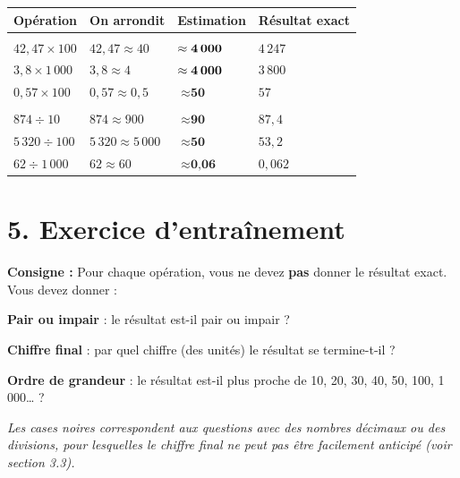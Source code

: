 \documentclass{exam}
\begin{document}
\begin{center}
\renewcommand{\arraystretch}{1.5}
\begin{tabular}{|>{\centering}p{3.5cm}|>{\centering}p{3.5cm}|>{\centering}p{3cm}|>{\centering\arraybackslash}p{3cm}|}
\hline
\rowcolor{gray!20}
\textbf{Opération} & \textbf{On arrondit} & \textbf{Estimation} & \textbf{Résultat exact} \\
\hline
\rowcolor{gray!10} \multicolumn{4}{|c|}{\textit{Multiplications}} \\ \hline
$42{,}47 \times 100$ & $42{,}47 \approx 40$ & $\approx \textbf{4\,000}$ & $4\,247$ \\ \hline
$3{,}8 \times 1\,000$ & $3{,}8 \approx 4$ & $\approx \textbf{4\,000}$ & $3\,800$ \\ \hline
$0{,}57 \times 100$ & $0{,}57 \approx 0{,}5$ & $\approx \textbf{50}$ & $57$ \\ \hline
\rowcolor{gray!10} \multicolumn{4}{|c|}{\textit{Divisions}} \\ \hline
$874 \div 10$ & $874 \approx 900$ & $\approx \textbf{90}$ & $87{,}4$ \\ \hline
$5\,320 \div 100$ & $5\,320 \approx 5\,000$ & $\approx \textbf{50}$ & $53{,}2$ \\ \hline
$62 \div 1\,000$ & $62 \approx 60$ & $\approx \textbf{0{,}06}$ & $0{,}062$ \\ \hline
\end{tabular}
\end{center}

\section*{\textcolor{blue!80!black}{5. Exercice d'entraînement}}

\begin{Indication}
\textbf{Consigne :} Pour chaque opération, vous ne devez \textbf{pas} donner le résultat exact. Vous devez donner :
\begin{compactitem}
\item \textbf{Pair ou impair} : le résultat est-il pair ou impair ?
\item \textbf{Chiffre final} : par quel chiffre (des unités) le résultat se termine-t-il ?
\item \textbf{Ordre de grandeur} : le résultat est-il plus proche de 10, 20, 30, 40, 50, 100, 1\,000\ldots{} ?
\end{compactitem}
\vspace{0.3em}
\textit{Les cases noires correspondent aux questions avec des nombres décimaux ou des divisions, pour lesquelles le chiffre final ne peut pas être facilement anticipé (voir section 3.3).}
\end{Indication}
\end{document}
